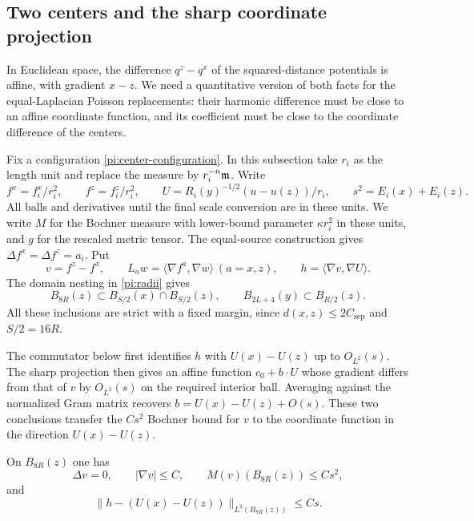 \subsection{Two centers and the sharp coordinate projection}

In Euclidean space, the difference $q^z-q^x$ of the squared-distance
potentials is affine, with gradient $x-z$.  We need a
quantitative version of both facts for the equal-Laplacian Poisson
replacements: their harmonic difference must be close to an affine
coordinate function, and its coefficient must be close to the
coordinate difference of the centers.

Fix a configuration \eqref{pi:center-configuration}.  In this
subsection take $r_i$ as the length unit and replace the measure
by $r_i^{-n}\mathfrak m$.  Write
\[
 f^x=f_i^x/r_i^2,\qquad f^z=f_i^z/r_i^2,
 \qquad U=R_i(y)^{-1/2}(u-u(z))/r_i,
 \qquad s^2=E_i(x)+E_i(z).
\]
All balls and derivatives until the final scale conversion are in
these units.  We write $M$ for the Bochner measure with lower-bound
parameter $\kappa r_i^2$ in these units, and $g$ for the rescaled
metric tensor.  The equal-source construction gives
$\Delta f^x=\Delta f^z=a_i$.  Put
\begin{equation}
 v=f^z-f^x,\qquad
 L_a w=\langle\nabla f^a,\nabla w\rangle\ (a=x,z),\qquad
 h=\langle\nabla v,\nabla U\rangle.
 \label{pi:pair-notation}
\end{equation}
The domain nesting in \eqref{pi:radii} gives
\[
 B_{8R}(z)\subset B_{S/2}(x)\cap B_{S/2}(z),
 \qquad
 B_{2L+4}(y)\subset B_{R/2}(z).
\]
All these inclusions are strict with a fixed margin, since
$d(x,z)\le2C_{\mathrm{sep}}$ and $S/2=16R$.

The commutator below first identifies $h$ with $U(x)-U(z)$ up to
$O_{L^2}(s)$.  The sharp projection then gives an affine function
$c_0+b\cdot U$ whose gradient differs from that of $v$ by
$O_{L^2}(s)$ on the required interior ball.  Averaging against the
normalized Gram matrix recovers $b=U(x)-U(z)+O(s)$.  These two
conclusions transfer the $Cs^2$ Bochner bound for $v$ to the
coordinate function in the direction $U(x)-U(z)$.

\begin{lemma}
\label{pi:commutator}
On $B_{8R}(z)$ one has
\begin{equation}
 \Delta v=0,\qquad
 |\nabla v|\le C,\qquad
 M(v)(B_{8R}(z))\le Cs^2,
 \label{pi:pair-poisson-bounds}
\end{equation}
and
\begin{equation}
 \|h-(U(x)-U(z))\|_{L^2(B_{8R}(z))}\le Cs.
 \label{pi:constant-direction}
\end{equation}
\end{lemma}


